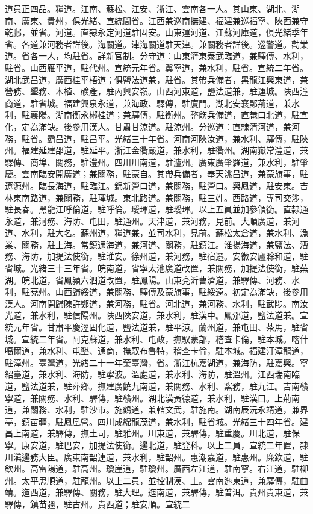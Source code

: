 \begin{pinyinscope}
道員正四品。糧道。江南、蘇松、江安、浙江、雲南各一人。其山東、湖北、湖南、廣東、貴州，俱光緒、宣統間省。江西兼巡南撫建、福建兼巡福寧、陜西兼守乾鄜，並省。河道。直隸永定河道駐固安。山東運河道、江蘇河庫道，俱光緒季年省。各道兼河務者詳後。海關道。津海關道駐天津。兼關務者詳後。巡警道。勸業道。省各一人，均駐省。詳新官制。分守道：山東濟東泰武臨道，兼驛傳、水利，駐省。山西雁平道，駐代州。宣統元年省。冀寧道，兼水利，駐省。宣統二年省。湖北武昌道，廣西桂平梧道；俱鹽法道兼，駐省。其帶兵備者，黑龍江興東道，兼營務、墾務、木植、礦產，駐內興安嶺。山西河東道，鹽法道兼，駐運城。陜西潼商道，駐省城。福建興泉永道，兼海政、驛傳，駐廈門。湖北安襄鄖荊道，兼水利，駐襄陽。湖南衡永郴桂道；兼驛傳，駐衡州。整飭兵備道，直隸口北道，駐宣化，定為滿缺。後參用漢人。甘肅甘涼道。駐涼州。分巡道：直隸清河道，兼河務，駐省。霸昌道，駐昌平。光緒三十年省。河南河陜汝道，兼水利、驛傳，駐陜州。福建延建邵道，駐延平。浙江金衢嚴道，兼水利，駐衢州。湖南嶽常澧道，兼驛傳、商埠、關務，駐澧州。四川川南道，駐瀘州。廣東廣肇羅道，兼水利，駐肇慶。雲南臨安開廣道；兼關務，駐蒙自。其帶兵備者，奉天洮昌道，兼蒙旗事，駐遼源州。臨長海道，駐臨江。錦新營口道，兼關務，駐營口。興鳳道，駐安東。吉林東南路道，兼關務，駐琿城。東北路道。兼關務，駐三姓。西路道，專司交涉，駐長春。黑龍江呼倫道，駐呼倫。璦琿道，駐璦琿。以上五員並加參領銜。直隸通永道，兼河務、海防、屯田，駐通州。天津道，兼河務，見前。大順廣道，兼河道、水利，駐大名。蘇州道，糧道兼，並司水利，見前。蘇松太倉道，兼水利、漁業、關務，駐上海。常鎮通海道，兼河道、關務，駐鎮江。淮揚海道，兼鹽法、漕務、海防，加提法使銜，駐淮安。徐州道，兼河務，駐宿遷。安徽安廬滁和道，駐省城。光緒三十三年省。皖南道，省寧太池廣道改置，兼關務，加提法使銜，駐蕪湖。皖北道，省鳳潁六泗道改置，駐鳳陽。山東兗沂曹濟道，兼驛傳、河務、水利，駐兗州。山西歸綏道，兼關務、驛傳及蒙旗事，駐綏遠。初定為滿缺，後參用漢人。河南開歸陳許鄭道，兼河務，駐省。河北道，兼河務、水利，駐武陟。南汝光道，兼水利，駐信陽州。陜西陜安道，兼水利，駐漢中。鳳邠道，鹽法道兼。宣統元年省。甘肅平慶涇固化道，鹽法道兼，駐平涼。蘭州道，兼屯田、茶馬，駐省城。宣統二年省。阿克蘇道，兼水利、屯政，撫馭蒙部，稽查卡倫，駐本城。喀什噶爾道，兼水利、屯墾、通商，撫馭布魯特，稽查卡倫，駐本城。福建汀漳龍道，駐漳州。臺灣道，光緒二十一年棄臺灣，省。浙江杭嘉湖道，兼海防，駐嘉興。寧紹臺道，兼水利、海防，駐寧波。溫處道，兼水利、海防，駐溫州。江西瑞南臨道，鹽法道兼，駐萍鄉。撫建廣饒九南道，兼關務、水利、窯務，駐九江。吉南贛寧道，兼關務、水利、驛傳，駐贛州。湖北漢黃德道，兼水利，駐漢口。上荊南道，兼關務、水利，駐沙巿。施鶴道，兼轄文武，駐施南。湖南辰沅永靖道，兼界亭，鎮苗疆，駐鳳凰營。四川成綿龍茂道，兼水利，駐省城。光緒三十四年省。建昌上南道，兼驛傳，撫土司，駐雅州。川東道，兼驛傳，駐重慶。川北道，駐保寧。康安道，駐巴安，加提法使銜。邊北道，駐登科。以上二員，宣統二年置，隸川滇邊務大臣。廣東南韶連道，兼水利，駐韶州。惠潮嘉道，駐惠州。廉欽道，駐欽州。高雷陽道，駐高州。瓊崖道，駐瓊州。廣西左江道，駐南寧。右江道，駐柳州。太平思順道，駐龍州。以上二員，並控制漢、土。雲南迤東道，兼驛傳，駐曲靖。迤西道，兼驛傳、關務，駐大理。迤南道，兼驛傳，駐普洱。貴州貴東道，兼驛傳，鎮苗疆，駐古州。貴西道；駐安順。宣統二
\end{pinyinscope}
